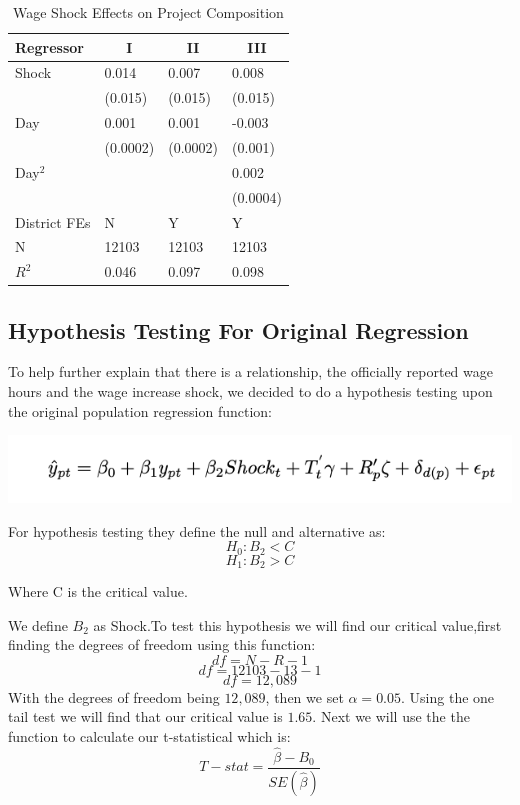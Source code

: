 \documentclass[12pt]{article}
\begin{document}
\begin{table}[!htbp] \centering 
  \caption{Wage Shock Effects on Project Composition} 
  \label{} 
\begin{tabular*}{\textwidth}{@{\extracolsep{\fill}}llll}\hline\hline
\multicolumn{1}{l}{Regressor}&\multicolumn{1}{c}{I}&\multicolumn{1}{c}{II}&\multicolumn{1}{c}{III}\tabularnewline
\hline
Shock&0.014$^{}$&0.007$^{}$&0.008$^{}$\tabularnewline
&{\scriptsize (0.015)}&{\scriptsize (0.015)}&{\scriptsize (0.015)}\tabularnewline
Day&0.001$^{}$&0.001$^{}$&-0.003$^{}$\tabularnewline
&{\scriptsize (0.0002)}&{\scriptsize (0.0002)}&{\scriptsize (0.001)}\tabularnewline
Day$^2$&&&0.002$^{}$\tabularnewline
&&&{\scriptsize (0.0004)}\tabularnewline
District FEs&N&Y&Y\tabularnewline
N&12103&12103&12103\tabularnewline
$R^2$&0.046&0.097&0.098\tabularnewline
\hline
\end{tabular*}
\end{table}



\subsection{Hypothesis Testing For Original Regression}
To help further explain that there is a relationship, the officially reported wage hours and the wage increase shock, we decided to do a hypothesis testing upon the original population regression function:

\begin{center}
\includegraphics[scale=0.5]{OEQ.png}
\end{center}
\newline
For hypothesis testing they define the null and alternative as:
\newline
$$H_0: B_2 < C$$
$$H_1: B_2 > C$$
\begin{center}
Where C is the critical value.
\end{center}

We define $B_2$ as Shock.To test this hypothesis we will find our critical value,first finding the degrees of freedom using this function: 
$$df = N-R-1$$
$$df = 12103 - 13 -1$$ 
$$df = 12,089$$ 
With the degrees of freedom being $12,089$, then we set $\alpha = 0.05$. Using the one tail test we will find that our critical value is $1.65$.
\newline
\newline
Next we will use the the function to calculate our t-statistical which is:
$$T-stat = \frac{\hat{\beta}-B_0}{SE(\hat{\beta})} $$
\end{document}
